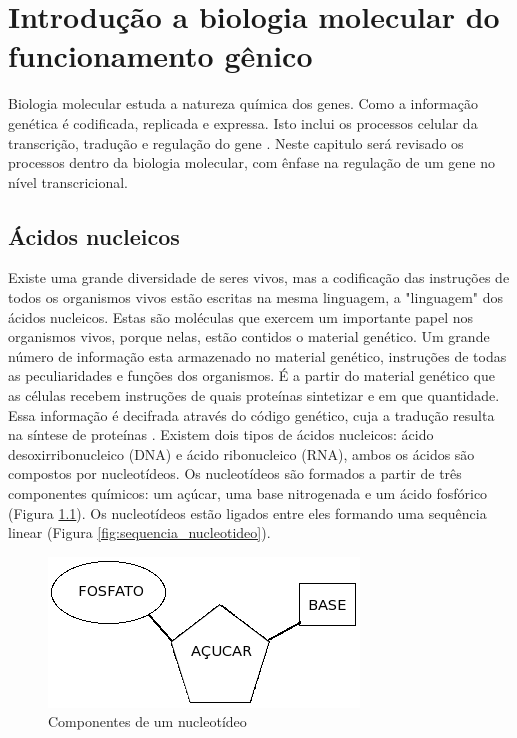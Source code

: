 \chapter{Introdução a biologia molecular do funcionamento gênico}

Biologia molecular estuda a natureza química dos genes. Como a informação genética é codificada, replicada e expressa. Isto inclui os processos celular da transcrição, tradução e regulação do gene \cite{Pierce2012}. Neste capitulo será revisado os processos dentro da biologia molecular, com ênfase na regulação de um gene no nível transcricional.

\section{Ácidos nucleicos}\label{acidos}

Existe uma grande diversidade de seres vivos, mas a codificação das instruções de todos os organismos vivos estão escritas na mesma linguagem, a "linguagem" dos ácidos nucleicos. Estas são moléculas que exercem um importante papel nos organismos vivos, porque nelas, estão contidos o material genético. Um grande número de informação esta armazenado no material genético, instruções de todas as peculiaridades e funções dos organismos. É a partir do material genético que as células recebem instruções de quais proteínas sintetizar e em que quantidade. Essa informação é decifrada através do código genético, cuja a tradução resulta na síntese de proteínas \cite{Zaha2000}. Existem dois tipos de ácidos nucleicos: ácido desoxirribonucleico (DNA) e ácido ribonucleico (RNA), ambos os ácidos são compostos por nucleotídeos. Os nucleotídeos são formados a partir de três componentes químicos: um açúcar, uma base nitrogenada e um ácido fosfórico (Figura \ref{fig:nucleotideo}). Os nucleotídeos estão ligados entre eles formando uma sequência linear (Figura \ref{fig:sequencia_nucleotideo}).

\begin{figure}[htb!]
    \centering
    \includegraphics[scale=0.7]{./figuras/componentes_nucleotideo.png}
    \caption{Componentes de um nucleotídeo}
    \label{fig:nucleotideo}
\end{figure}


